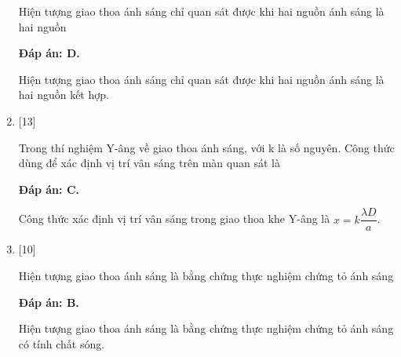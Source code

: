 \begin{enumerate}[label=\bfseries Câu \arabic*:]
	\cauhoi
	{Hiện tượng giao thoa ánh sáng chỉ quan sát được khi hai nguồn ánh sáng là hai nguồn 
	}
	
	\loigiai
	{		\textbf{Đáp án: D.}
		
Hiện tượng giao thoa ánh sáng chỉ quan sát được khi hai nguồn ánh sáng là hai nguồn kết hợp.
		
	}

    \item {} [13]
    
	\cauhoi
	{Trong thí nghiệm Y-âng về giao thoa ánh sáng, với k là số nguyên. Công thức dùng để xác định vị trí vân sáng trên màn quan sát là
	}
	
	\loigiai
	{		\textbf{Đáp án: C.}
		
Công thức xác định vị trí vân sáng trong giao thoa khe Y-âng là $x= k \dfrac{\lambda D}{a}$.
		
	}

    \item {} [10]
    
	\cauhoi
	{Hiện tượng giao thoa ánh sáng là bằng chứng thực nghiệm chứng tỏ ánh sáng
	}
	
	\loigiai
	{		\textbf{Đáp án: B.}
		
Hiện tượng giao thoa ánh sáng là bằng chứng thực nghiệm chứng tỏ ánh sáng có tính chất sóng.
		
}
\end{enumerate}

